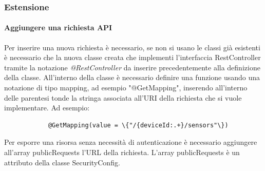 	\subsubsection{Estensione}
		\paragraph{Aggiungere una richiesta API}
			Per inserire una nuova richiesta è necessario, se non si usano le classi già esistenti è necessario che la nuova classe creata che implementi l'interfaccia RestController tramite la notazione \textit{@RestController} da inserire precedentemente alla definizione della classe.
			All'interno della classe è necessario definire una funzione usando una notazione di tipo mapping, ad esempio "@GetMapping", inserendo all'interno delle parentesi tonde la stringa associata all'URI della richiesta che si vuole implementare.
			Ad esempio:
			\begin{verbatim}
			@GetMapping(value = \{"/{deviceId:.+}/sensors"\})
			\end{verbatim}
			Per esporre una risorsa senza necessità di autenticazione è necessario aggiungere all'array publicRequests l'URL della richiesta. L'array publicRequests è un attributo della classe SecurityConfig.
